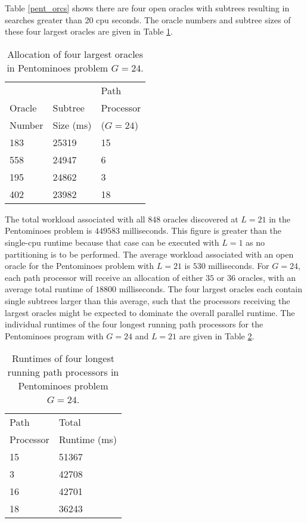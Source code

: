 Table \ref{pent_orcs} shows there are four open oracles with subtrees resulting in searches
greater than 20 cpu seconds.   The oracle numbers and subtree sizes of these four largest
oracles are given in Table \ref{pent_top_four}.

\begin{table}[htbp]
{\small
\begin{tabular}{| l | l | l |}
\hline
       &           & Path      \\
Oracle & Subtree   & Processor \\
Number & Size (ms) & ($G=24$)  \\
\hline
183    & 25319     & 15 \\
558    & 24947     & 6  \\
195    & 24862     & 3  \\
402    & 23982     & 18 \\
\hline
\end{tabular}
}
\caption{Allocation of four largest oracles in Pentominoes problem $G=24$.}
\label{pent_top_four}
\end{table}

The total workload associated with all $848$ oracles discovered at
$L=21$ in the Pentominoes problem is $449583$ milliseconds.  This
figure is greater than the single-cpu runtime because that case can be
executed with $L=1$ as no partitioning is to be performed.  The
average workload associated with an open oracle for the Pentominoes
problem with $L=21$ is $530$ milliseconds.  For $G=24$, each path
processor will receive an allocation of either $35$ or $36$ oracles,
with an average total runtime of $18800$ milliseconds.  The four
largest oracles each contain single subtrees larger than this
average, such that the processors receiving the largest oracles might
be expected to dominate the overall parallel runtime.  The individual
runtimes of the four longest running path processors for the
Pentominoes program with $G=24$ and $L=21$ are given in Table
\ref{pent_long_runs}.

\begin{table}[htbp]
{\small
\begin{tabular}{| l | l |}
\hline
Path      & Total        \\
Processor & Runtime (ms) \\
\hline
15    & 51367   \\
3     & 42708   \\
16    & 42701   \\
18    & 36243   \\
\hline
\end{tabular}
}
\caption{Runtimes of four longest running path processors in Pentominoes problem $G=24$.}
\label{pent_long_runs}
\end{table}

